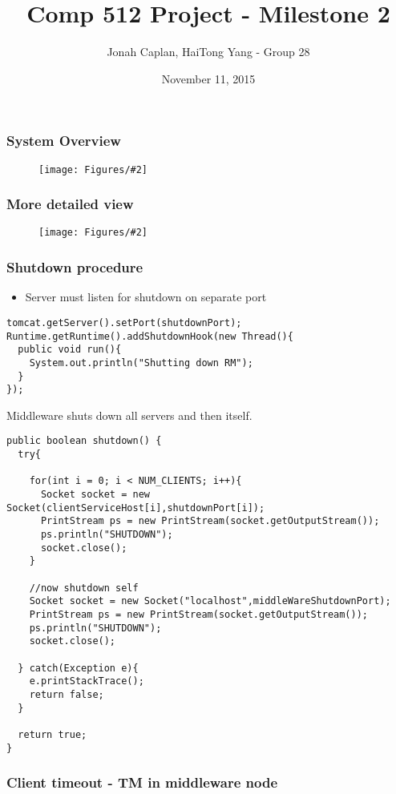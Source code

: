 \documentclass[10pt]{beamer}
\title[Comp 512 Project - Milestone 2]{Comp 512 Project - Milestone 2} %
\author{Jonah Caplan, HaiTong Yang - Group 28} %
\institute %
{
McGill University \\ %
\medskip
\textit{jonah.caplan@mail.mcgill.ca,hai.yang@mail.mcgill.ca} %
}
\date{November 11, 2015} %
\newcommand{\addfigure}[2]{

\begin{figure}[h]
	\centering
	\texttt{[image: Figures/\#2]} 
\end{figure}

}
\begin{document}
\begin{frame}
\titlepage %
\end{frame}


\begin{frame}
\frametitle{System Overview}
\addfigure{0.5}{system.pdf}
\end{frame}

\begin{frame}
\frametitle{More detailed view}
\addfigure{0.3}{sequence.pdf}
\end{frame}

\begin{frame}[fragile]
\frametitle{Shutdown procedure}
\begin{itemize}
  \item Server must listen for shutdown on separate port
\end{itemize}
\begin{lstlisting}
tomcat.getServer().setPort(shutdownPort);
Runtime.getRuntime().addShutdownHook(new Thread(){
  public void run(){
    System.out.println("Shutting down RM");
  }
}); 
\end{lstlisting}
\end{frame}

\begin{frame}[fragile]
Middleware shuts down all servers and then itself.

\begin{lstlisting}
public boolean shutdown() {
  try{
    
    for(int i = 0; i < NUM_CLIENTS; i++){
      Socket socket = new Socket(clientServiceHost[i],shutdownPort[i]);
      PrintStream ps = new PrintStream(socket.getOutputStream());
      ps.println("SHUTDOWN");
      socket.close();
    }
    
    //now shutdown self
    Socket socket = new Socket("localhost",middleWareShutdownPort);
    PrintStream ps = new PrintStream(socket.getOutputStream());
    ps.println("SHUTDOWN");
    socket.close();
    
  } catch(Exception e){
    e.printStackTrace();
    return false;
  }
  
  return true;
}
\end{lstlisting}
\end{frame}


\begin{frame}
\frametitle{Client timeout - TM in middleware node}
\begin{algorithm}[H]
 
 
 \end{algorithm}

\end{frame}
\end{document}
